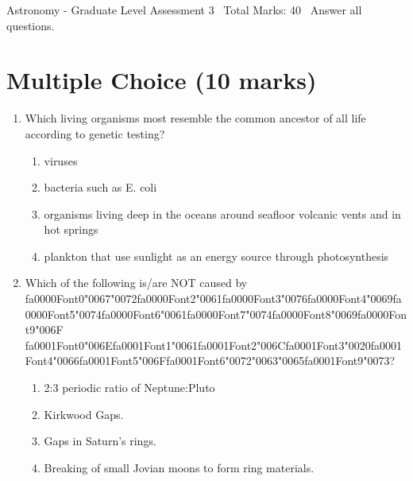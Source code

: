 \documentclass[12pt]{article}
\begin{document}
\begin{center}
Astronomy - Graduate Level Assessment 3 \
Total Marks: 40 \
Answer all questions.
\end{center}

\section*{Multiple Choice (10 marks)}
\begin{enumerate}[label=\arabic*.]
\item Which living organisms most resemble the common ancestor of all life according to genetic
testing?
\begin{enumerate}[label=(\alph*)]
    \item viruses
    \item bacteria such as E. coli
    \item organisms living deep in the oceans around seafloor volcanic vents and in hot springs
    \item plankton that use sunlight as an energy source through photosynthesis
\end{enumerate}
\item Which of the following is/are NOT caused by {\csname fa0000Font0\endcsname\char"0067}{\char"0072}{\csname fa0000Font2\endcsname\char"0061}{\csname fa0000Font3\endcsname\char"0076}{\csname fa0000Font4\endcsname\char"0069}{\csname fa0000Font5\endcsname\char"0074}{\csname fa0000Font6\endcsname\char"0061}{\csname fa0000Font7\endcsname\char"0074}{\csname fa0000Font8\endcsname\char"0069}{\csname fa0000Font9\endcsname\char"006F} {\csname fa0001Font0\endcsname\char"006E}{\csname fa0001Font1\endcsname\char"0061}{\csname fa0001Font2\endcsname\char"006C}{\csname fa0001Font3\endcsname\char"0020}{\csname fa0001Font4\endcsname\char"0066}{\csname fa0001Font5\endcsname\char"006F}{\csname fa0001Font6\endcsname\char"0072}{\char"0063}{\char"0065}{\csname fa0001Font9\endcsname\char"0073}?
\begin{enumerate}[label=(\alph*)]
    \item 2:3 periodic ratio of Neptune:Pluto
    \item Kirkwood Gaps.
    \item Gaps in Saturn's rings.
    \item Breaking of small Jovian moons to form ring materials.
\end{enumerate}

\end{enumerate}
\end{document}
